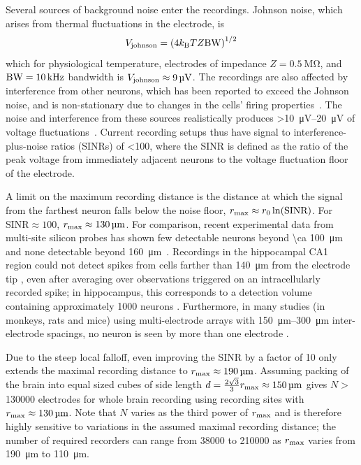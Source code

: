 Several sources of background noise enter the recordings.
Johnson noise, which arises from thermal fluctuations in the electrode, is \[V_{\text{\scriptsize johnson}} = \left(4k_{\text{\scriptsize B}} T Z \text{BW}\right)^{1/2}\]
which for physiological temperature, electrodes of impedance $Z = \SI{0.5}{\mega\ohm}$, and $\text{BW} = \SI{10}{\kilo\hertz}$ bandwidth is $V_{\text{\scriptsize johnson}} \approx \SI{9}{\micro\volt}$.
The recordings are also affected by interference from other neurons, which has been reported to exceed the Johnson noise, and is non-stationary due to changes in the cells' firing properties~\cite{sahani99}. 
The noise and interference from these sources realistically produces \SIrange{>10}{20}{\micro\volt} of voltage fluctuations~\cite{camunas13}.
Current recording setups thus have signal to interference-plus-noise ratios (SINRs) of \num{<100}, where the SINR is defined as the ratio of the peak voltage from immediately adjacent neurons to the voltage fluctuation floor of the electrode.

A limit on the maximum recording distance is the distance at which the signal from the farthest neuron falls below the noise floor, $r_{\text{\scriptsize max}} \approx r_{\text{\scriptsize 0}}\ln(\text{SINR})$. For $\text{SINR} \approx 100$, $r_{\text{\scriptsize max}} \approx \SI{130}{\micro\meter}$. For comparison, recent experimental data from multi-site silicon probes has shown few detectable neurons beyond \SI{\ca 100}{\micro\meter} and none detectable beyond \SI{160}{\micro\meter}~\cite{du11}. 
Recordings in the hippocampal CA1 region could not detect spikes from cells farther than \SI{140}{\micro\meter} from the electrode tip \cite{Henze2000}, even after averaging over observations triggered on an intracellularly recorded spike; in hippocampus, this corresponds to a detection volume containing approximately 1000 neurons \cite{Buzaki2004}. Furthermore, in many studies (in monkeys, rats and mice) using multi-electrode arrays with \SIrange{150}{300}{\micro\meter} inter-electrode spacings, no neuron is seen by more than one electrode \cite{Wessberg2000, Carmena2003, Koralek2012, Jin2010}.

Due to the steep local falloff, even improving the SINR by a factor of 10 only extends the maximal recording distance to $r_{\text{\scriptsize max}} \approx \SI{190}{\micro\meter}$. Assuming packing of the brain into equal sized cubes of side length $d = \frac{2\sqrt{3}}{3}r_{\text{\scriptsize max}} \approx \SI{150}{\micro\meter}$ gives $N >$ \num{130000} electrodes for whole brain recording using recording sites with $r_{\text{\scriptsize max}} \approx \SI{130}{\micro\meter}$. Note that $N$ varies as the third power of $r_{\text{\scriptsize max}}$ and is therefore highly sensitive to variations in the assumed maximal recording distance; the number of required recorders can range from \num{38000} to \num{210000} as $r_{\text{\scriptsize max}}$ varies from \SI{190}{\micro\meter} to \SI{110}{\micro\meter}.


